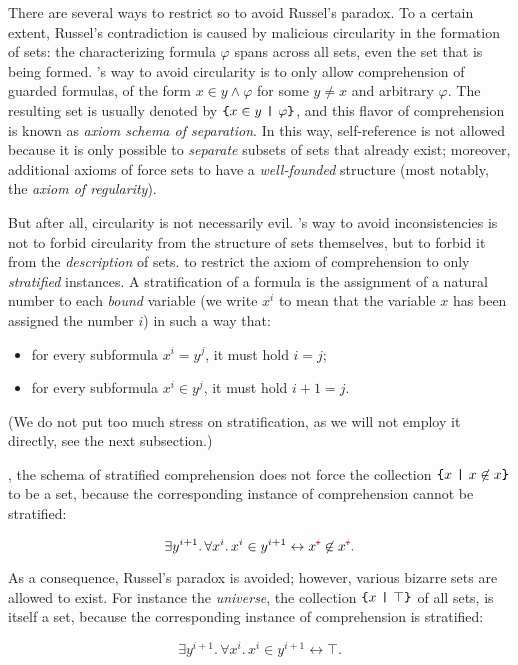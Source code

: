 \documentclass[sigplan,10pt,anonymous,review]{acmart}%
\begin{document}
There are several ways to restrict \SetCompr{} so to avoid Russel's paradox. To a certain extent, Russel's contradiction is caused by malicious circularity in the formation of sets: the characterizing formula $\varphi$ spans across all sets, even the set that is being formed. \ZF's way to avoid circularity is to only allow comprehension of guarded formulas, of the form $x \in y \land \varphi$ for some $y\neq x$ and arbitrary $\varphi$. The resulting set is usually denoted by $\text{\texttt{\{}} x \in y ~\text{\texttt{|}}~ \varphi \text{\texttt{\}}}$, and this flavor of comprehension is known as \emph{axiom schema of separation}. In this way, self-reference is not allowed because it is only possible to \emph{separate} subsets of sets that already exist; moreover, additional axioms of \ZF{} force sets to have a \emph{well-founded} structure (most notably, the \emph{axiom of regularity}).

But after all, circularity is not necessarily evil. \NF's way to avoid inconsistencies is not to forbid circularity from the structure of sets themselves, but to forbid it from the \emph{description} of sets. \TODO{} to restrict the axiom of comprehension to only \emph{stratified} instances. A stratification of a formula is the assignment of a natural number to each \emph{bound} variable (we write $x^i$ to mean that the variable $x$ has been assigned the number $i$) in such a way that:
\begin{itemize}
  \item for every subformula $x^i = y^j$, it must hold $i=j$;
  \item for every subformula $x^i \in y^j$, it must hold $i+1=j$.
\end{itemize}
(We do not put too much stress on stratification, as we will not employ it directly, see the next subsection.)

, the schema of stratified comprehension does not force the collection $\text{\texttt{\{}} x ~\text{\texttt{|}}~ x \not\in x \text{\texttt{\}}}$ to be a set, because the corresponding instance of comprehension cannot be stratified:

\[ \exists y^{i+1}.\, \forall x^i.\, x^i \in y^{i+1} \leftrightarrow x^{\stkout{\textcolor{red}i}} \not\in x^{\stkout{\textcolor{red}i}}. \]

As a consequence, Russel's paradox is avoided; however, various bizarre sets are allowed to exist. For instance the \emph{universe}, the collection $\text{\texttt{\{}} x ~\text{\texttt{|}}~ \top \text{\texttt{\}}}$ of all sets, is itself a set, because the corresponding instance of comprehension is stratified:

\[ \exists y^{i+1}.\, \forall x^i.\, x^i \in y^{i+1} \leftrightarrow \top. \]
\end{document}
